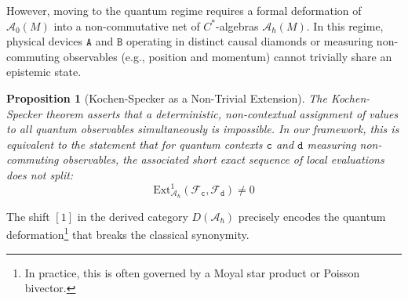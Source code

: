\documentclass{article}
\newtheorem{pp}{Proposition}
\numberwithin{tm}{section}
\numberwithin{dn}{section}
\numberwithin{as}{section}
\numberwithin{rk}{section}
\numberwithin{lem}{section}
\numberwithin{ax}{section}
\numberwithin{pp}{section}
\numberwithin{eg}{section}
\numberwithin{war}{section}
\numberwithin{equation}{section}
\numberwithin{prop}{section}
\numberwithin{nt}{section}
\numberwithin{rc}{section}
\def\code#1{\texttt{#1}}
\begin{document}
However, moving to the quantum regime requires a formal deformation of $\mathcal{A}_0(M)$ into a non-commutative net of $C^*$-algebras $\mathcal{A}_\hbar(M)$. In this regime, physical devices $\code{A}$ and $\code{B}$ operating in distinct causal diamonds or measuring non-commuting observables (e.g., position and momentum) cannot trivially share an epistemic state.

\begin{pp}[Kochen-Specker as a Non-Trivial Extension]
	The Kochen-Specker theorem asserts that a deterministic, non-contextual assignment of values to all quantum observables simultaneously is impossible. In our framework, this is equivalent to the statement that for quantum contexts $\code{c}$ and $\code{d}$ measuring non-commuting observables, the associated short exact sequence of local evaluations does not split:
	\begin{equation}
		\text{Ext}^1_{\mathcal{A}_\hbar}(\mathcal{F}_\code{c}, \mathcal{F}_\code{d}) \neq 0
	\end{equation}
\end{pp}

The shift $[1]$ in the derived category $D(\mathcal{A}_\hbar)$ precisely encodes the quantum deformation\footnote{In practice, this is often governed by a Moyal star product or Poisson bivector.} that breaks the classical synonymity. 
\end{document}
